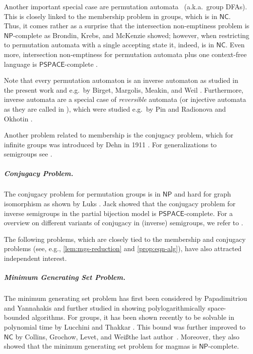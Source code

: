 \documentclass[anonymous,letter,UKenglish,cleveref,autoref,thm-restate]{lipics-v2021}
\newcommand{\eg}{e.g.~}
\newcommand{\NC}{\ensuremath{\mathsf{NC}}\xspace}
\newcommand{\NP}{\ensuremath{\mathsf{NP}}\xspace}
\newcommand{\PSPACE}{\ensuremath{\mathsf{PSPACE}}\xspace}
\theoremstyle{plain}
\theoremstyle{plain}
\newcommand{\mysubparagraph}[1]{\vspace*{-2mm}\subparagraph*{#1}}
\begin{document}
Another important special case are permutation automata~\cite{Thierrin68} (a.k.a.\ group DFAs). 
This is closely linked to the membership problem in groups, which is in \NC \cite{BabaiLS87}. 
Thus, it comes rather as a surprise that the intersection non-emptiness problem is \NP-complete as Brondin, Krebs, and McKenzie \cite{BlondinKM12} showed; however, when restricting to permutation automata with a single accepting state it, indeed, is in \NC \cite{BlondinKM12}.
Even more, intersection non-emptiness for permutation automata plus one context-free language is \PSPACE-complete \cite{LohreyRZ22}.

Note that every permutation automaton is an inverse automaton as studied in the present work and \eg by Birget, Margolis, Meakin, and Weil \cite{BirgetMMW94}.
Furthermore, inverse automata are a special case of \emph{reversible} automata (or injective automata as they are called in \cite{BirgetMMW94}), which were studied \eg by Pin \cite{Pin87} and Radionova and Okhotin \cite{RadionovaO24}.




\medbreak

Another problem related to membership is the conjugacy problem, which for infinite groups was introduced by Dehn in 1911 \cite{Dehn11}.
For generalizations to semigroups see \cite{Otto84}.

\mysubparagraph{Conjugacy Problem.}
The conjugacy problem for permutation groups is in \NP and hard for graph isomorphism as shown by Luks \cite{Luks93}.
Jack \cite{Jack23} showed that the conjugacy problem for inverse semigroups in the partial bijection model is \PSPACE-complete. 
For a overview on different variants of conjugacy in (inverse) semigroups, we refer to \cite{AraujoKinyonKnieczny19}.

\medbreak

The following problems, which are closely tied to the membership and conjugacy problems (see, e.g., \cref{lem:mgs-reduction} and \cref{prop:eqn-alg}), have also attracted independent interest.

\mysubparagraph{Minimum Generating Set Problem.}

The minimum generating set problem has first been considered by Papadimitriou and Yannahakis \cite{PapadimitriouY96} and further studied in \cite{ArvindT06,Tang13Thesis} showing polylogarithmically space-bounded algorithms.
For groups, it has been shown recently to be solvable in polynomial time by Lucchini and Thakkar \cite{LucchiniT24}.
This bound was further improved to \NC by Collins, Grochow, Levet, and \ifAnonimous Weiß\else the last author\fi~\cite{CollinsGLW24}.
Moreover, they also showed that the minimum generating set problem for magmas is \NP-complete.
\end{document}
